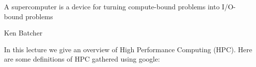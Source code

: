 \epigraph{A supercomputer is a device for turning compute-bound problems into I/O-bound problems}{Ken Batcher}

\minitoc




In this lecture we give an overview of High Performance Computing (HPC). Here are some definitions of HPC gathered using google:

